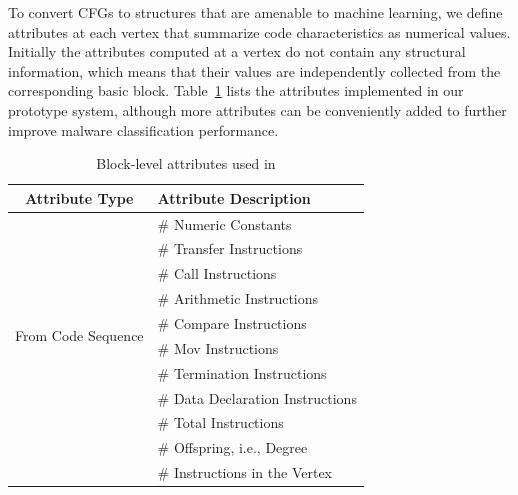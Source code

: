 



To convert CFGs to structures that are amenable to machine learning, we define attributes at each vertex that summarize code characteristics as numerical values.
Initially the attributes computed at a vertex do not contain any structural information, which means that their values are independently collected from the corresponding basic block.
Table~\ref{MG:Tab:UsedAttributes} lists the attributes implemented in our prototype system, although more attributes can be conveniently added to further improve malware classification performance.

\begin{table}[htbp]
    \caption{Block-level attributes used in \sysname}
    \begin{center}
        \begin{tabular}{c|l}
            \hline
            Attribute Type & Attribute Description \\
            \hline
            \multirow{10}{*}{From Code Sequence} & \# Numeric Constants \\
            & \# Transfer Instructions         \\
            & \# Call Instructions             \\
            & \# Arithmetic Instructions       \\
            & \# Compare Instructions          \\
            & \# Mov Instructions              \\
            & \# Termination Instructions      \\
            & \# Data Declaration Instructions \\
            & \# Total Instructions            \\
            \hline
            \multirow{2}{*}{From Vertex Structure} & \# Offspring, i.e., Degree \\
            & \# Instructions in the Vertex    \\
            \hline
        \end{tabular}
        \label{MG:Tab:UsedAttributes}
    \end{center}
\end{table}

